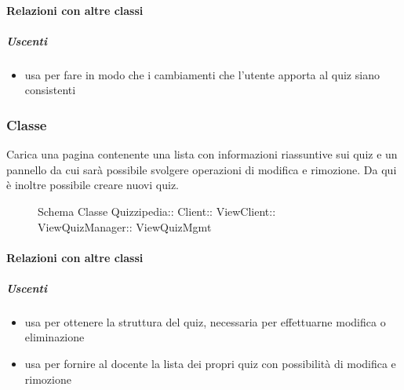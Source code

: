 \paragraph{Relazioni con altre classi}
\subparagraph{Uscenti}
\begin{itemize}
\item usa  per fare in modo che i cambiamenti che l'utente apporta al quiz siano consistenti
\end{itemize}
\subsubsection{Classe }
Carica una pagina contenente una lista con informazioni riassuntive sui quiz e un pannello da cui sarà possibile svolgere operazioni di modifica e rimozione. Da qui è inoltre possibile creare nuovi quiz.
\begin{figure}[H]
\centering
\noindent{}
\caption[Schema Classe ViewQuizMgmt]{Schema Classe Quizzipedia:: Client:: ViewClient:: ViewQuizManager:: ViewQuizMgmt}
\end{figure}
\paragraph{Relazioni con altre classi}
\subparagraph{Uscenti}
\begin{itemize}
\item usa  per ottenere la struttura del quiz, necessaria per effettuarne modifica o eliminazione
\item usa  per fornire al docente la lista dei propri quiz con possibilità di modifica e rimozione
\end{itemize}
